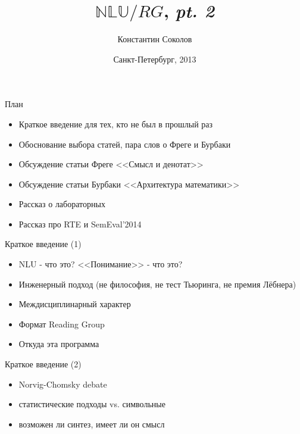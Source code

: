 \documentclass{beamer}
\begin{document}
\title{\huge{$\mathbb{NLU}/RG$, \textit{pt. 2}}}
\author{Константин Соколов}
\date{Санкт-Петербург, 2013} 
\begin{frame}
    \thispagestyle{empty}
    \titlepage
\end{frame}



\begin{frame}{План}
    \setcounter{framenumber}{1}
    \begin{itemize}
        \item Краткое введение для тех, кто не был в прошлый раз
        \item Обоснование выбора статей, пара слов о Фреге и Бурбаки
        \item Обсуждение статьи Фреге <<Смысл и денотат>>
        \item Обсуждение статьи Бурбаки <<Архитектура математики>>
        \item Рассказ о лабораторных
        \item Рассказ про RTE и SemEval'2014
    \end{itemize}
\end{frame}

\begin{frame}{Краткое введение (1)}
    \begin{itemize}
        \item NLU - что это? <<Понимание>> - что это?
        \item Инженерный подход (не философия, не тест Тьюринга, не премия Лёбнера)
        \item Междисциплинарный характер
        \item Формат Reading Group
        \item Откуда эта программа
    \end{itemize}
\end{frame}

\begin{frame}{Краткое введение (2)}
    \begin{itemize}
        \item Norvig-Chomsky debate
        \item статистические подходы vs. символьные
        \item возможен ли синтез, имеет ли он смысл
    \end{itemize}
\end{frame}
\end{document}
